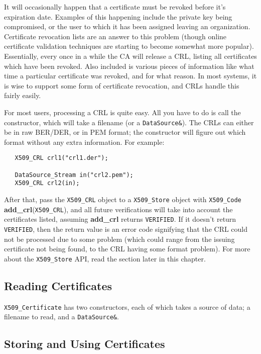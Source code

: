 \documentclass{article}
\newcommand{\function}[1]{\textbf{#1}}
\newcommand{\type}[1]{\texttt{#1}}
\begin{document}
It will occasionally happen that a certificate must be revoked before it's
expiration date. Examples of this happening include the private key being
compromised, or the user to which it has been assigned leaving an
organization. Certificate revocation lists are an answer to this problem
(though online certificate validation techniques are starting to become
somewhat more popular). Essentially, every once in a while the CA will release
a CRL, listing all certificates which have been revoked. Also included is
various pieces of information like what time a particular certificate was
revoked, and for what reason. In most systems, it is wise to support some form
of certificate revocation, and CRLs handle this fairly easily.

For most users, processing a CRL is quite easy. All you have to do is call the
constructor, which will take a filename (or a \type{DataSource\&}). The CRLs
can either be in raw BER/DER, or in PEM format; the constructor will figure out
which format without any extra information. For example:

\begin{verbatim}
   X509_CRL crl1("crl1.der");

   DataSource_Stream in("crl2.pem");
   X509_CRL crl2(in);
\end{verbatim}

After that, pass the \type{X509\_CRL} object to a \type{X509\_Store} object
with \type{X509\_Code} \function{add\_crl}(\type{X509\_CRL}), and all future
verifications will take into account the certificates listed, assuming
\function{add\_crl} returns \type{VERIFIED}. If it doesn't return
\type{VERIFIED}, then the return value is an error code signifying that the CRL
could not be processed due to some problem (which could range from the issuing
certificate not being found, to the CRL having some format problem). For more
about the \type{X509\_Store} API, read the section later in this chapter.

\pagebreak

\subsection{Reading Certificates}

\type{X509\_Certificate} has two constructors, each of which takes a source of
data; a filename to read, and a \type{DataSource\&}.

\subsection{Storing and Using Certificates}
\end{document}
